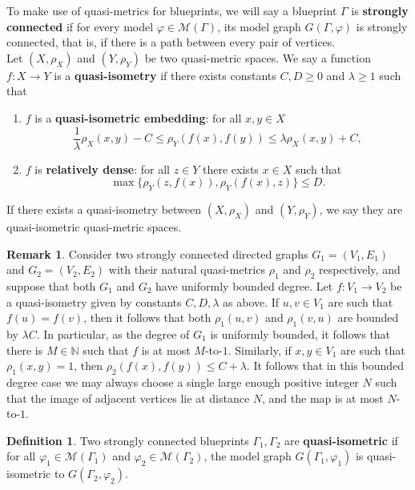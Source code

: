 \documentclass{article}
\theoremstyle{definition}
\newtheorem{remark}[theorem]{Remark}
\newtheorem{defn}[theorem]{Definition} %
\theoremstyle{definition}
\newcommand{\NN}{\mathbb{N}}
\newcommand{\M}{\mathcal{M}}
\newcommand{\define}[1]{\textbf{#1}}
\begin{document}
To make use of quasi-metrics for blueprints, we will say a blueprint $\Gamma$ is \define{strongly connected} if for every model $\varphi\in \mathcal{M}(\Gamma)$, its model graph $G(\Gamma, \varphi)$ is strongly connected, that is, if there is a path between every pair of vertices.\\

Let $(X, \rho_X)$ and $(Y, \rho_Y)$ be two quasi-metric spaces. We say a function $f\colon X\to Y$ is a \define{quasi-isometry} if there exists constants $C, D\geq 0$ and $\lambda\geq1$ such that
\begin{enumerate}
    \item $f$ is a \define{quasi-isometric embedding}: for all $x,y\in X$
    \[\frac{1}{\lambda}\rho_X(x,y) - C \leq \rho_Y(f(x), f(y))\leq \lambda \rho_X(x,y) + C,\]
    \item $f$ is \define{relatively dense}: for all $z\in Y$ there exists $x\in X$ such that 
    $$\max\{\rho_Y(z, f(x)),\rho_Y(f(x),z)\}\leq D.$$
\end{enumerate}

If there exists a quasi-isometry between $(X, \rho_X)$ and $(Y, \rho_Y)$, we say they are quasi-isometric quasi-metric spaces.

\begin{remark}
\label{rem:Nto1}
Consider two strongly connected directed graphs $G_1=(V_1,E_1)$ and $G_2=(V_2,E_2)$ with their natural quasi-metrics $\rho_1$ and $\rho_2$ respectively, and suppose that both $G_1$ and $G_2$ have uniformly bounded degree. Let $f\colon V_1\to V_2$ be a quasi-isometry given by constants $C,D,\lambda$ as above. If $u,v \in V_1$ are such that $f(u)=f(v)$, then it follows that both $\rho_1(u,v)$ and $\rho_1(v,u)$ are bounded by $\lambda C$. In particular, as the degree of $G_1$ is uniformly bounded, it follows that there is $M \in \NN$ such that $f$ is at most $M$-to-$1$. Similarly, if $x,y \in V_1$ are such that $\rho_1(x,y) = 1$, then $\rho_2(f(x),f(y)) \leq C+\lambda$. It follows that in this bounded degree case we may always choose a single large enough positive integer $N$ such that the image of adjacent vertices lie at distance $N$, and the map is at most $N$-to-$1$.
\end{remark}

\begin{defn}
    Two strongly connected blueprints $\Gamma_1,\Gamma_2$ are \define{quasi-isometric} if for all $\varphi_1\in\M(\Gamma_1)$ and $\varphi_2\in\M(\Gamma_2)$, the model graph $G(\Gamma_1, \varphi_1)$ is quasi-isometric to $G(\Gamma_2, \varphi_2)$.
\end{defn}
\end{document}
